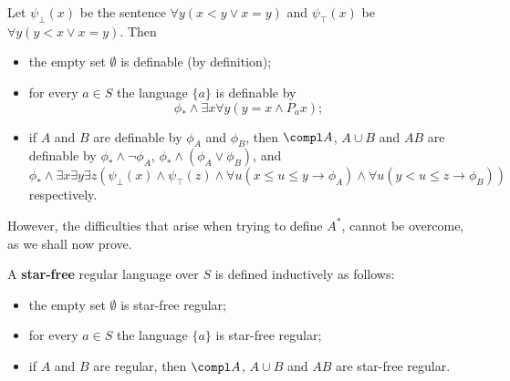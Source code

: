 \begin{rem}
Let $\psi_{\bot}(x) $ be the sentence $\forall y (x < y \lor x=y)$ and $\psi_{\top}(x)$ be $\forall y(y <x \lor x=y)$. 
Then 
\begin{itemize}
\item the empty set $\emptyset$ is definable (by definition);
\item for every $a \in S$ the language $\{a\}$ is definable by $$\phi_{\ast} \land \exists x \forall y(y=x \land P_a x)\text{;}$$
\item if $A$ and $B$ are definable by $\phi_A$ and $\phi_B$, then $\compl A$, $A \cup B$ and $AB$ are definable by $\phi_{\ast} \land \lnot \phi_{A}$, $\phi_{\ast} \land (\phi_{A} \lor \phi_B)$, and $$\phi_{\ast} \land \exists x \exists y \exists z (\psi_{\bot}(x) \land \psi_{\top}(z) \land \forall u (x \le u \le y \rightarrow \phi_{A}) \land \forall u (y < u \le z \rightarrow \phi_{B}))$$
respectively. 
\end{itemize}
However, the difficulties that arise when trying to define $A^{\ast}$, cannot be overcome, as we shall now prove.  
\end{rem}

\begin{defn} A \textbf{star-free} regular language over $S$ is defined inductively as follows:
\begin{itemize}
\item the empty set $\emptyset$ is star-free regular;
\item for every $a \in S$ the language $\{a\}$ is star-free regular;
\item if $A$ and $B$ are regular, then $\compl A$, $A \cup B$ and $AB$ are star-free regular.
\end{itemize} 
\end{defn}

